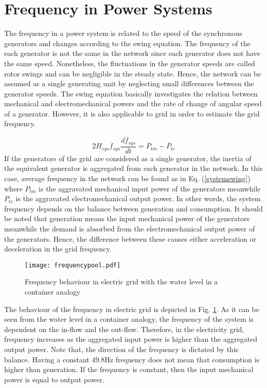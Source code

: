 \section{Frequency in Power Systems}
The frequency in a power system is related to the speed of the synchronous generators and changes according to the swing equation. The frequency of the each generator is not the same in the network since each generator does not have the same speed. Nonetheless, the fluctuations in the generator speeds are called rotor swings and can be negligible in the steady state. Hence, the network can be assumed as a single generating unit by neglecting small differences between the generator speeds. The swing equation basically investigates the relation between mechanical and electromechanical powers and the rate of change of angular speed of a generator. However, it is also applicable to grid in order to estimate the grid frequency.\par
\begin{equation}
\label{systemswing}
2H_{sys}\overline{f}_{sys}\frac{d\overline{f}_{sys}}{dt}=\overline{P}_{tm}-\overline{P}_{te}
\end{equation}
If the generators of the grid are considered as a single generator, the inertia of the equivalent generator is aggregated from each generator in the network. In this case, average frequency in the network can be found as in Eq. (\ref{systemswing}) where $P_{tm}$ is the aggravated mechanical input power of the generators meanwhile $P_{te}$ is the aggravated electromechanical output power. In other words, the system frequency depends on the balance between generation and consumption. It should be noted that generation means the input mechanical power of the generators meanwhile the demand is absorbed from the electromechanical output power of the generators. Hence, the difference between these causes either acceleration or deceleration in the grid frequency. \par
\begin{figure}[h!]
	\centering
	\texttt{[image: frequencypool.pdf]}
	\caption{Frequency behaviour in electric grid with the water level in a container analogy \cite{Eto2010}}
	\label{frequencyingrid}
\end{figure}
The behaviour of the frequency in electric grid is depicted in Fig. \ref{frequencyingrid}. As it can be seen from the water level in a container analogy, the frequency of the system is dependent on the in-flow and the out-flow. Therefore, in the electricity grid, frequency increases as the aggregated input power is higher than the aggregated output power. Note that, the direction of the frequency is dictated by this balance. Having a constant 49.8Hz frequency does not mean that consumption is higher than generation. If the frequency is constant, then the input mechanical power is equal to output power.\par
